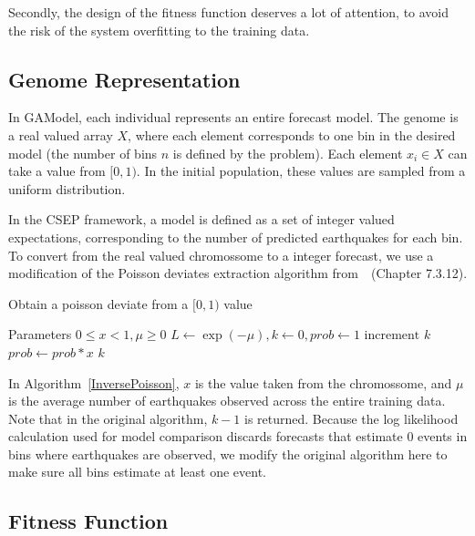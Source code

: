\documentclass{sig-alternate}
\begin{document}
Secondly, the design of the fitness function deserves a lot of
attention, to avoid the risk of the system overfitting to the training
data.

\subsection{Genome Representation}


In GAModel, each individual represents an entire forecast model. The
genome is a real valued array $X$, where each element corresponds to
one bin in the desired model (the number of bins $n$ is defined by the
problem). Each element $x_i \in X$ can take a value from $[0,1)$. In
  the initial population, these values are sampled from a uniform
  distribution.

In the CSEP framework, a model is defined as a set of integer valued
expectations, corresponding to the number of predicted earthquakes for
each bin. To convert from the real valued chromossome to a integer
forecast, we use a modification of the Poisson deviates extraction
algorithm from~\cite{NumericalRecipes}~(Chapter 7.3.12).

\begin{algorithm}
  \caption{Obtain a poisson deviate from a $[0,1)$ value}
  \label{InversePoisson}
  \begin{algorithmic}
    \STATE Parameters $0 \leq x < 1, \mu \geq 0$
    \STATE $L \gets \exp{(-\mu)}, k \gets 0, prob \gets 1$
    \REPEAT 
    \STATE $\text{increment }k$
    \STATE $prob \gets prob*x$
    \RETURN $k$
  \end{algorithmic}
\end{algorithm}

In Algorithm~\ref{InversePoisson}, $x$ is the value taken from the
chromossome, and $\mu$ is the average number of earthquakes observed
across the entire training data. Note that in the original algorithm,
$k-1$ is returned. Because the log likelihood calculation used for
model comparison discards forecasts that estimate $0$ events in bins
where earthquakes are observed, we modify the original algorithm here
to make sure all bins estimate at least one event.


\subsection{Fitness Function}
\end{document}
